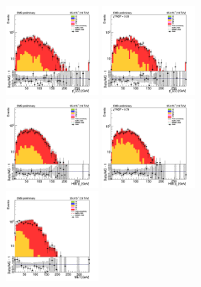 \begin{figure}[tbp]
  \begin{center}
    \includegraphics[width=0.31\textwidth]{figures/ee_300_april18/ee_300_good_SR_bdt_sideBand_april18/hpt0_ee_SR_prefit_plot_apr18.png}
    \includegraphics[width=0.31\textwidth]{figures/ee_300_april18/ee_300_good_SR_bdt_sideBand_april18/hpt0_ee_SR_FullPostfit_plot_apr18.png}\\
    \includegraphics[width=0.31\textwidth]{figures/ee_300_april18/ee_300_good_SR_bdt_sideBand_april18/hpt1_ee_SR_prefit_plot_apr18.png}
    \includegraphics[width=0.31\textwidth]{figures/ee_300_april18/ee_300_good_SR_bdt_sideBand_april18/hpt1_ee_SR_FullPostfit_plot_apr18.png}\\
    \includegraphics[width=0.31\textwidth]{figures/ee_300_april18/ee_300_good_SR_bdt_sideBand_april18/met_pt_ee_SR_prefit_plot_apr18.png}

\end{center}
\end{figure}
